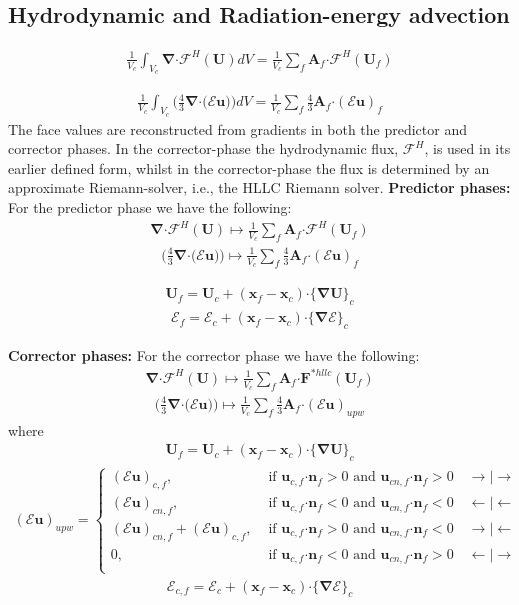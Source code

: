 \documentclass[10pt,letterpaper,notitlepage]{article}
\numberwithin{equation}{section}
\newcommand{\bnabla}{\boldsymbol{\nabla}}
\newcommand{\position}{\mathbf{x}}
\newcommand{\velocity}{\mathbf{u}}
\newcommand{\dotp}{\boldsymbol{\cdot}}
\newcommand{\RadE}{\mathcal{E}}
\newcommand{\HydroF}{\mathcal{F}^H}
\newcommand{\HydroU}{\mathbf{U}}
\newcommand{\AreaVec}{\mathbf{A}}
\newcommand{\NormalVec}{\mathbf{n}}
\newcommand{\beqn}{\begin{equation}\begin{aligned}}
\newcommand{\eeqn}{\end{aligned}\end{equation}}
\begin{document}
\subsection{Hydrodynamic and Radiation-energy advection}
\label{section:fv_hydro_and_radE_advection}
\beqn 
\frac{1}{V_c} \int_{V_c} 
\bnabla \dotp \HydroF (\HydroU) 
dV = \frac{1}{V_c}
\sum_f \AreaVec_f \dotp  \HydroF(\HydroU_f)
\eeqn 

\beqn 
\frac{1}{V_c} \int_{V_c} 
\biggr(\frac{4}{3} \bnabla \dotp \bigr(\RadE \velocity)\biggr)
dV = \frac{1}{V_c}
\sum_f \frac{4}{3}  \AreaVec_f \dotp (\RadE \velocity)_f
\eeqn 
The face values are reconstructed from gradients in both the predictor and corrector phases. In the corrector-phase the hydrodynamic flux, $\HydroF$, is used in its earlier defined form, whilst in the corrector-phase the flux is determined by an approximate Riemann-solver, i.e., the HLLC Riemann solver.
\newline
\newline 
\textbf{Predictor phases:}\newline 
For the predictor phase we have the following:
\beqn 
\bnabla \dotp \HydroF (\HydroU)
\mapsto 
\frac{1}{V_c}
\sum_f \AreaVec_f \dotp  \HydroF(\HydroU_f)
\eeqn 
\beqn 
\biggr(\frac{4}{3} \bnabla \dotp \bigr(\RadE \velocity)\biggr)
\mapsto 
\frac{1}{V_c}
\sum_f \frac{4}{3}  \AreaVec_f \dotp (\RadE \velocity)_f
\eeqn 

\beqn 
\HydroU_f = \HydroU_c + (\position_f - \position_c) \dotp \{ \bnabla\HydroU \}_c
\eeqn 
\beqn 
\RadE_f = \RadE_c + (\position_f - \position_c) \dotp \{ \bnabla\RadE \}_c
\eeqn 

\noindent
\textbf{Corrector phases:}\newline
For the corrector phase we have the following:
\beqn 
\bnabla \dotp \HydroF (\HydroU)
\mapsto 
\frac{1}{V_c}
\sum_f \AreaVec_f \dotp  \mathbf{F}^{*hllc}(\HydroU_f)
\eeqn 
\beqn 
\biggr(\frac{4}{3} \bnabla \dotp \bigr(\RadE \velocity)\biggr)
\mapsto 
\frac{1}{V_c}
\sum_f \frac{4}{3}  \AreaVec_f \dotp (\RadE \velocity)_{upw}
\eeqn 
where
\beqn 
\HydroU_f = \HydroU_c+ (\position_f - \position_c) \dotp \{ \bnabla\HydroU \}_c
\eeqn  
\beqn
(\RadE \velocity)_{upw} =
\begin{cases}
	(\RadE \velocity)_{c,f} , &\text{ if } 
	\velocity_{c,f} \dotp  \NormalVec_f > 0 \text{ and } \velocity_{cn,f} \dotp  \NormalVec_f > 0 
	\quad  \rightarrow | \rightarrow \\
	(\RadE \velocity)_{cn,f} , &\text{ if } 
	\velocity_{c,f} \dotp  \NormalVec_f < 0 \text{ and } \velocity_{cn,f} \dotp  \NormalVec_f < 0
	\quad  \leftarrow | \leftarrow \\
	(\RadE \velocity)_{cn,f} + (\RadE \velocity)_{c,f}, &\text{ if } 
	\velocity_{c,f} \dotp  \NormalVec_f > 0 \text{ and } \velocity_{cn,f} \dotp  \NormalVec_f < 0 
	\quad  \rightarrow | \leftarrow \\
	0, &\text{ if } 
	\velocity_{c,f} \dotp  \NormalVec_f < 0 \text{ and } \velocity_{cn,f} \dotp  \NormalVec_f > 0
	\quad  \leftarrow | \rightarrow \\
\end{cases}
\eeqn 
\beqn 
\RadE_{c,f} = \RadE_c + (\position_f - \position_c) \dotp \{ \bnabla\RadE \}_c
\eeqn
\end{document}

